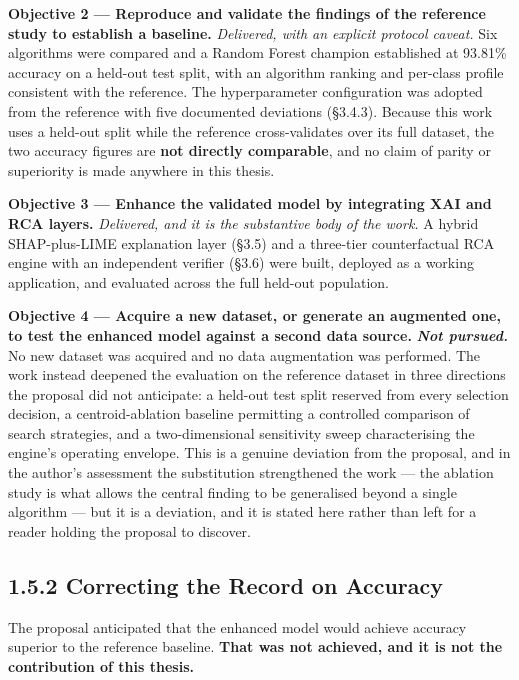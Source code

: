\textbf{Objective 2 --- Reproduce and validate the findings of the reference study to establish a baseline.}
\emph{Delivered, with an explicit protocol caveat.} Six algorithms were compared and a Random Forest champion established at 93.81\% accuracy on a held-out test split, with an algorithm ranking and per-class profile consistent with the reference. The hyperparameter configuration was adopted from the reference with five documented deviations (§3.4.3). Because this work uses a held-out split while the reference cross-validates over its full dataset, the two accuracy figures are \textbf{not directly comparable}, and no claim of parity or superiority is made anywhere in this thesis.

\textbf{Objective 3 --- Enhance the validated model by integrating XAI and RCA layers.}
\emph{Delivered, and it is the substantive body of the work.} A hybrid SHAP-plus-LIME explanation layer (§3.5) and a three-tier counterfactual RCA engine with an independent verifier (§3.6) were built, deployed as a working application, and evaluated across the full held-out population.

\textbf{Objective 4 --- Acquire a new dataset, or generate an augmented one, to test the enhanced model against a second data source.}
\textbf{\emph{Not pursued.}} No new dataset was acquired and no data augmentation was performed. The work instead deepened the evaluation on the reference dataset in three directions the proposal did not anticipate: a held-out test split reserved from every selection decision, a centroid-ablation baseline permitting a controlled comparison of search strategies, and a two-dimensional sensitivity sweep characterising the engine's operating envelope. This is a genuine deviation from the proposal, and in the author's assessment the substitution strengthened the work --- the ablation study is what allows the central finding to be generalised beyond a single algorithm --- but it is a deviation, and it is stated here rather than left for a reader holding the proposal to discover.

\hypertarget{correcting-the-record-on-accuracy}{%
\subsection{1.5.2 Correcting the Record on Accuracy}\label{correcting-the-record-on-accuracy}}

The proposal anticipated that the enhanced model would achieve accuracy superior to the reference baseline. \textbf{That was not achieved, and it is not the contribution of this thesis.}

